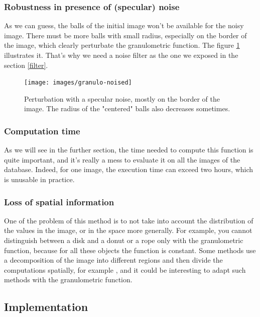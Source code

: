 \subsubsection{Robustness in presence of (specular) noise}

As we can guess, the balls of the initial image won't be available for the noisy image. There must be more balls with small radius, especially on the border of the image, which clearly perturbate the granulometric function. The figure \ref{device9-6-noised} illustrates it. That's why we need a noise filter as the one we exposed in the section \ref{filter}.

\begin{figure}[!ht]
    \centering
    \texttt{[image: images/granulo-noised]}
    \caption{Perturbation with a specular noise, mostly on the border of the image. The radius of the "centered" balls also decreases sometimes.}
	\label{device9-6-noised}
\end{figure}

\subsubsection{Computation time}

As we will see in the further section, the time needed to compute this function is quite important, and it's really a mess to evaluate it on all the images of the database. Indeed, for one image, the execution time can exceed two hours, which is unusable in practice.

\subsubsection{Loss of spatial information}

\label{loss-information}

One of the problem of this method is to not take into account the distribution of the values in the image, or in the space more generally. For example, you cannot distinguish between a disk and a donut or a rope only with the granulometric function, because for all these objects the function is constant. Some methods use a decomposition of the image into different regions and then divide the computations spatially, for example \cite{spacial-decompo}, and it could be interesting to adapt such methods with the granulometric function.

\subsection{Implementation}

